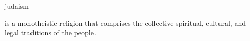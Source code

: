 \documentclass{stex}
\begin{document}
\begin{smodule}{judaism}
\begin{sparagraph}[style=symdoc]
 is a monotheistic religion that comprises the collective
spiritual, cultural, and legal traditions of the  people.
\end{sparagraph}
\end{smodule}
\end{document}
